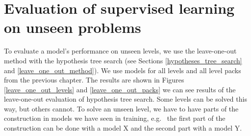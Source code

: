 \section{Evaluation of supervised learning on unseen problems
}
\label{eval_of_unseen_levels}
To evaluate a model's performance on unseen levels, we use the leave-one-out method with the hypothesis tree search (see Sections \ref{hypotheses_tree_search} and \ref{leave_one_out_method}).  We use models for all levels and all level packs from the previous chapter. The results are shown in Figures \ref{leave_one_out_levels} and \ref{leave_one_out_packs} we can see results of the leave-one-out evaluation of hypothesis tree search. Some levels can be solved this way, but others cannot. To solve an unseen level, we have to have parts of the construction in models we have seen in training, e.g.~ the first part of the construction can be done with a model X and the second part with a model Y.

